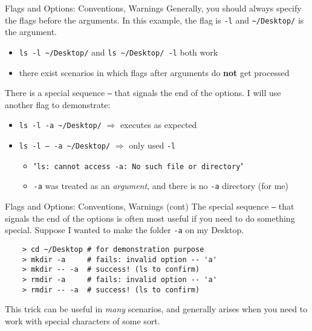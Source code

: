 \documentclass[11pt]{beamer}
\begin{document}
\begin{frame}[fragile]{Flags and Options: Conventions, Warnings}
  Generally, you should always specify the flags before the arguments.  In this example, the flag is \texttt{-l} and
  \texttt{\textasciitilde/Desktop/} is the argument.
  \begin{itemize}
    \item \texttt{ls -l \textasciitilde/Desktop/} and \texttt{ls \textasciitilde/Desktop/ -l} both work
    \item there exist scenarios in which flags after arguments do \textbf{not} get processed
  \end{itemize}
  There is a special sequence \texttt{--} that signals the end of the options.  I will use another flag to demonstrate:
  \begin{itemize}
    \item \texttt{ls -l -a \textasciitilde/Desktop/} $\Rightarrow$ executes as expected
    \item \texttt{ls -l -- -a \textasciitilde/Desktop/} $\Rightarrow$ only used \texttt{-l}
    \begin{itemize}
      \item {\tiny "\texttt{ls: cannot access -a: No such file or directory}"}
      \item \texttt{-a} was treated as an \emph{argument}, and there is no \texttt{-a} directory (for me)
    \end{itemize}
  \end{itemize}
\end{frame}

\begin{frame}[fragile]{Flags and Options: Conventions, Warnings (cont)}
  The special sequence \texttt{--} that signals the end of the options is often most useful if you need to do something
  special.  Suppose I wanted to make the folder \texttt{-a} on my Desktop.

  \begin{verbatim}
    > cd ~/Desktop # for demonstration purpose
    > mkdir -a     # fails: invalid option -- 'a'
    > mkdir -- -a  # success! (ls to confirm)
    > rmdir -a     # fails: invalid option -- 'a'
    > rmdir -- -a  # success! (ls to confirm)
  \end{verbatim}

  This trick can be useful in \emph{many} scenarios, and generally arises when you need to work with special characters
  of some sort.
\end{frame}
\end{document}

